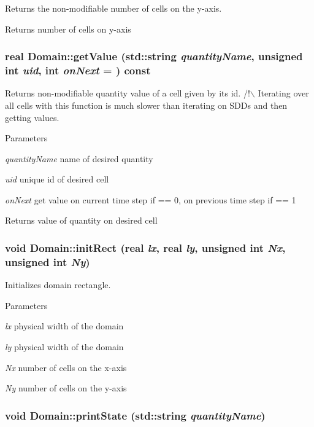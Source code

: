 Returns the non-\/modifiable number of cells on the y-\/axis. \begin{DoxyReturn}{Returns}
number of cells on y-\/axis 
\end{DoxyReturn}
\hypertarget{classDomain_a6023c81f9233bcc48ad6f315829e9725}{
\subsubsection[{getValue}]{\setlength{\rightskip}{0pt plus 5cm}real Domain::getValue (std::string {\em quantityName}, \/  unsigned int {\em uid}, \/  int {\em onNext} = {}) const}}
\label{classDomain_a6023c81f9233bcc48ad6f315829e9725}


Returns non-\/modifiable quantity value of a cell given by its id. /!$\backslash$ Iterating over all cells with this function is much slower than iterating on SDDs and then getting values.


\begin{DoxyParams}{Parameters}
\item[{\em quantityName}]name of desired quantity \item[{\em uid}]unique id of desired cell \item[{\em onNext}]get value on current time step if == 0, on previous time step if == 1\end{DoxyParams}
\begin{DoxyReturn}{Returns}
value of quantity on desired cell 
\end{DoxyReturn}
\hypertarget{classDomain_a853266061b629ff1f920b46c06c478d6}{
\subsubsection[{initRect}]{\setlength{\rightskip}{0pt plus 5cm}void Domain::initRect (real {\em lx}, \/  real {\em ly}, \/  unsigned int {\em Nx}, \/  unsigned int {\em Ny})}}
\label{classDomain_a853266061b629ff1f920b46c06c478d6}


Initializes domain rectangle. 
\begin{DoxyParams}{Parameters}
\item[{\em lx}]physical width of the domain \item[{\em ly}]physical width of the domain \item[{\em Nx}]number of cells on the x-\/axis \item[{\em Ny}]number of cells on the y-\/axis \end{DoxyParams}
\hypertarget{classDomain_a1163559d75540c4cd29c7aa775feca80}{
\subsubsection[{printState}]{\setlength{\rightskip}{0pt plus 5cm}void Domain::printState (std::string {\em quantityName})}}
\label{classDomain_a1163559d75540c4cd29c7aa775feca80}


